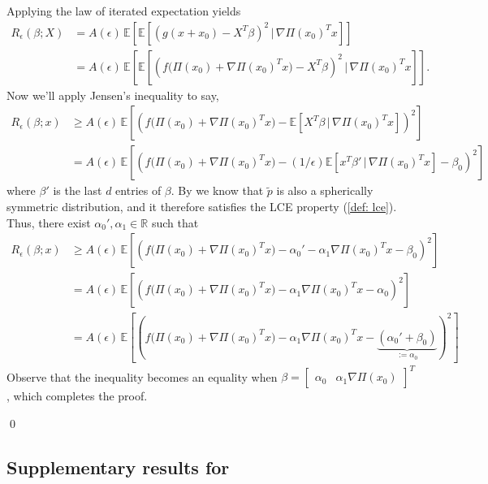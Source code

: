 \documentclass[11pt]{article}
\begin{document}
Applying the law of iterated expectation yields
\begin{align*}
    R_{\epsilon}(\beta; X)&= A(\epsilon)\,\mathbb{E}\left[\mathbb{E}\left[\left(g(x+x_0)-X^{T}\beta\right)^2 \, \Big| 
    \, \nabla\Pi(x_0)^{T}x\right]\right]\\
    &= A(\epsilon)\,\mathbb{E}\left[\mathbb{E}\left[\left(f\Big(\Pi(x_0) + \nabla\Pi(x_0)^{T}x\Big)-X^{T}\beta\right)^2 \, \Big| 
    \, \nabla\Pi(x_0)^{T}x\right]\right].
\end{align*}
Now we'll apply Jensen's inequality to say,
\begin{align*}
    R_{\epsilon}(\beta; x) &\geq A( \epsilon)\,\mathbb{E}\left[\left(f\Big(\Pi(x_0) + \nabla\Pi(x_0)^{T}x\Big)-\mathbb{E}\left[X^{T}\beta \, \Big| 
    \, \nabla\Pi(x_0)^{T}x\right]\right)^2\right] \\
    &= A( \epsilon)\,\mathbb{E}\left[\left(f\Big(\Pi(x_0) + \nabla\Pi(x_0)^{T}x\Big)-(1/\epsilon)\mathbb{E}\left[x^{T}\beta' \, \Big| 
    \, \nabla\Pi(x_0)^{T}x\right]- \beta_0\right)^2\right]
\end{align*}
where $\beta'$ is the last $d$ entries of $\beta$. By  we know that $\tilde{p}$ is also a spherically symmetric distribution, and it therefore satisfies the LCE property (\cref{def: lce}). Thus, there exist $\alpha_0', \alpha_1 \in \mathbb{R}$ such that 
\begin{align}
    R_{\epsilon}(\beta; x) &\geq A( \epsilon)\,\mathbb{E}\left[\left(f\Big(\Pi(x_0) + \nabla\Pi(x_0)^{T}x\Big)-\alpha_0' - \alpha_1\nabla\Pi(x_0)^{T}x - \beta_0\right)^2\right] \\
    &=  A( \epsilon)\,\mathbb{E}\left[\left(f\Big(\Pi(x_0) + \nabla\Pi(x_0)^{T}x\Big) - \alpha_1\nabla\Pi(x_0)^{T}x - \alpha_0\right)^2\right] \\
    &= A( \epsilon)\,\mathbb{E}\left[\left(f\Big(\Pi(x_0) + \nabla\Pi(x_0)^{T}x\Big) - \alpha_1\nabla\Pi(x_0)^{T}x - \underbrace{(\alpha_0' + \beta_0)}_{:= \alpha_0}\right)^2\right]\label{eq: surrogate risk lower bound}
\end{align}
Observe that the inequality becomes an equality when $\beta = \begin{bmatrix}\alpha_0  & \alpha_1\nabla \Pi(x_0) \end{bmatrix}^T$, which completes the proof.

\qed{}

\subsection{Supplementary results for }
\end{document}
